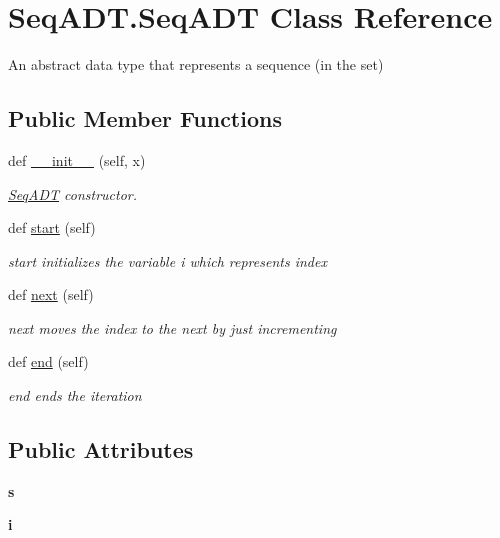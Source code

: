 \hypertarget{class_seq_a_d_t_1_1_seq_a_d_t}{}\section{Seq\+A\+D\+T.\+Seq\+A\+DT Class Reference}
\label{class_seq_a_d_t_1_1_seq_a_d_t}


An abstract data type that represents a sequence (in the set)  


\subsection*{Public Member Functions}
\begin{DoxyCompactItemize}
\item 
def \mbox{\hyperlink{class_seq_a_d_t_1_1_seq_a_d_t_a9330066e7aa744127c86671e1a66e155}{\+\_\+\+\_\+init\+\_\+\+\_\+}} (self, x)
\begin{DoxyCompactList}\small\item\em \mbox{\hyperlink{class_seq_a_d_t_1_1_seq_a_d_t}{Seq\+A\+DT}} constructor. \end{DoxyCompactList}\item 
\mbox{\label{class_seq_a_d_t_1_1_seq_a_d_t_ad89d5ccf139e928a65000f00e605692e}} 
def \mbox{\hyperlink{class_seq_a_d_t_1_1_seq_a_d_t_ad89d5ccf139e928a65000f00e605692e}{start}} (self)
\begin{DoxyCompactList}\small\item\em start initializes the variable i which represents index \end{DoxyCompactList}\item 
def \mbox{\hyperlink{class_seq_a_d_t_1_1_seq_a_d_t_a1d2ee97ccd784507ae32c00150dc6fb0}{next}} (self)
\begin{DoxyCompactList}\small\item\em next moves the index to the next by just incrementing \end{DoxyCompactList}\item 
def \mbox{\hyperlink{class_seq_a_d_t_1_1_seq_a_d_t_a7d8df17dae5df548ca32054075ca04b8}{end}} (self)
\begin{DoxyCompactList}\small\item\em end ends the iteration \end{DoxyCompactList}\end{DoxyCompactItemize}
\subsection*{Public Attributes}
\begin{DoxyCompactItemize}
\item 
\mbox{\label{class_seq_a_d_t_1_1_seq_a_d_t_a1c751be49f197faecbd36352484be18d}} 
{\bfseries s}
\item 
\mbox{\label{class_seq_a_d_t_1_1_seq_a_d_t_a9c8c61691d99a130acbfd6f4c50e3ee0}} 
{\bfseries i}
\end{DoxyCompactItemize}
